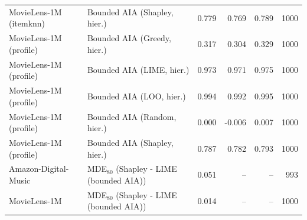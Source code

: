 \begin{table}[!htbp]
\begin{tabular}{@{}llrrrr@{}}
MovieLens-1M (itemknn) & Bounded AIA (Shapley, hier.) & 0.779 & 0.769 & 0.789 & 1000 \\
MovieLens-1M (profile) & Bounded AIA (Greedy, hier.) & 0.317 & 0.304 & 0.329 & 1000 \\
MovieLens-1M (profile) & Bounded AIA (LIME, hier.) & 0.973 & 0.971 & 0.975 & 1000 \\
MovieLens-1M (profile) & Bounded AIA (LOO, hier.) & 0.994 & 0.992 & 0.995 & 1000 \\
MovieLens-1M (profile) & Bounded AIA (Random, hier.) & 0.000 & -0.006 & 0.007 & 1000 \\
MovieLens-1M (profile) & Bounded AIA (Shapley, hier.) & 0.787 & 0.782 & 0.793 & 1000 \\
Amazon-Digital-Music & MDE$_80$ (Shapley - LIME (bounded AIA)) & 0.051 & -- & -- & 993 \\
MovieLens-1M & MDE$_80$ (Shapley - LIME (bounded AIA)) & 0.014 & -- & -- & 1000 \\
\bottomrule
\end{tabular}
\end{table}